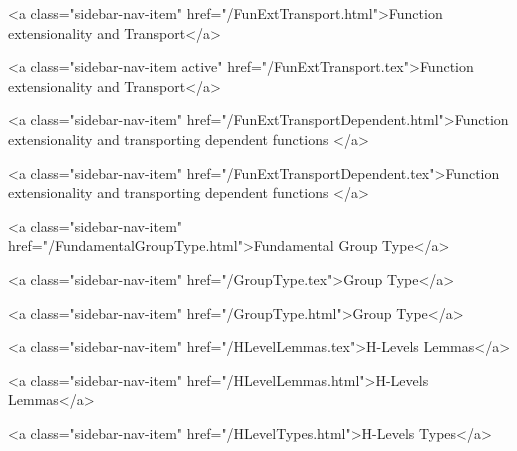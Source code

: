       
    
      
        
          <a class="sidebar-nav-item" href="/FunExtTransport.html">Function extensionality and Transport</a>
        
      
    
      
        
          <a class="sidebar-nav-item active" href="/FunExtTransport.tex">Function extensionality and Transport</a>
        
      
    
      
        
          <a class="sidebar-nav-item" href="/FunExtTransportDependent.html">Function extensionality and transporting dependent functions </a>
        
      
    
      
        
          <a class="sidebar-nav-item" href="/FunExtTransportDependent.tex">Function extensionality and transporting dependent functions </a>
        
      
    
      
        
          <a class="sidebar-nav-item" href="/FundamentalGroupType.html">Fundamental Group Type</a>
        
      
    
      
        
          <a class="sidebar-nav-item" href="/GroupType.tex">Group Type</a>
        
      
    
      
        
          <a class="sidebar-nav-item" href="/GroupType.html">Group Type</a>
        
      
    
      
        
          <a class="sidebar-nav-item" href="/HLevelLemmas.tex">H-Levels Lemmas</a>
        
      
    
      
        
          <a class="sidebar-nav-item" href="/HLevelLemmas.html">H-Levels Lemmas</a>
        
      
    
      
        
          <a class="sidebar-nav-item" href="/HLevelTypes.html">H-Levels Types</a>
        
      
    
